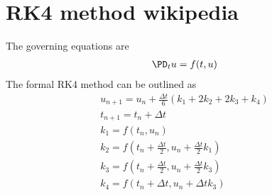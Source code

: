 \documentclass[11pt]{article}
\begin{document}
\section{RK4 method wikipedia}
The governing equations are
\begin{equation}\begin{aligned}
  \PD_t u = f(t,u) \\
\end{aligned}\end{equation}
The formal RK4 method can be outlined as
\begin{equation}\begin{aligned}
  u_{n+1} = u_n + \frac{\Delta t}{6} (k_1 + 2 k_2 + 2k_3 + k_4) \\
  t_{n+1} = t_n + \Delta t \\
  k_1 = f(t_n,u_n) \\
  k_2 = f\left(t_n + \frac{\Delta t}{2} , u_n + \frac{\Delta t}{2} k_1 \right) \\
  k_3 = f\left(t_n + \frac{\Delta t}{2} , u_n + \frac{\Delta t}{2} k_3 \right) \\
  k_4 = f\left(t_n + \Delta t , u_n + \Delta t k_3 \right) \\
\end{aligned}\end{equation}
\end{document}
